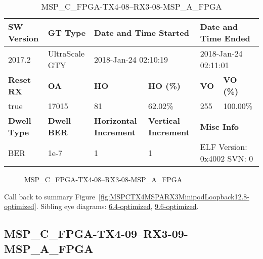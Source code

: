 \begin{table}[h]
\centering
\caption{MSP\_C\_FPGA-TX4-08--RX3-08-MSP\_A\_FPGA}
\label{tab:MSPCFPGATX408RX308MSPAFPGA12.8-optimized}
\begin{tabular}{@{}|l|l|l|l|l|l|@{}}
\toprule
\textbf{SW Version}                & \textbf{GT Type}   & \multicolumn{2}{l|}{\textbf{Date and Time Started}}            & \multicolumn{2}{l|}{\textbf{Date and Time Ended}}        \\ \midrule
2017.2                       & UltraScale GTY          & \multicolumn{2}{l|}{2018-Jan-24 02:10:19}                   & \multicolumn{2}{l|}{2018-Jan-24 02:11:01}               \\ \midrule
\textbf{Reset RX}                  & \textbf{OA} & \textbf{HO}   & \textbf{HO (\%)} & \textbf{VO} & \textbf{VO (\%)} \\ \midrule
true & 17015        & 81          & 62.02\%        & 255        & 100.00\%       \\ \midrule
\textbf{Dwell Type}                & \textbf{Dwell BER} & \textbf{Horizontal Increment} & \textbf{Vertical Increment}    & \multicolumn{2}{l|}{\textbf{Misc Info}}                  \\ \midrule
BER                            & 1e-7        & 1        & 1           & \multicolumn{2}{l|}{ELF Version: 0x4002 SVN: 0}                         \\ \bottomrule
\end{tabular}
\end{table}

\begin{figure}[h]
\caption{MSP\_C\_FPGA-TX4-08--RX3-08-MSP\_A\_FPGA} \label{fig:MSPCFPGATX408RX308MSPAFPGA12.8-optimized}
\end{figure}

Call back to summary Figure~\ref{fig:MSPCTX4MSPARX3MinipodLoopback12.8-optimized}.
Sibling eye diagrams: \hyperref[sec:MSPCFPGATX408RX308MSPAFPGA6.4-optimized]{6.4-optimized}, \hyperref[sec:MSPCFPGATX408RX308MSPAFPGA9.6-optimized]{9.6-optimized}.

\clearpage
\newpage


\subsection{MSP\_C\_FPGA-TX4-09--RX3-09-MSP\_A\_FPGA}\label{sec:MSPCFPGATX409RX309MSPAFPGA12.8-optimized}


